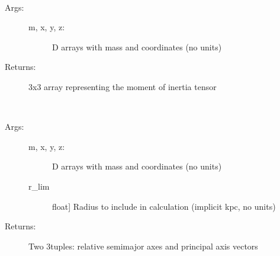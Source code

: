 \documentclass[letterpaper,10pt,english]{sphinxmanual}
\begin{document}
\begin{fulllineitems}
\begin{fulllineitems}
\end{fulllineitems}


\begin{fulllineitems}
\label{\detokenize{remnant:galaxy.remnant.Remnant.I_tensor}}~\begin{description}
\item[{Args:}] \leavevmode\begin{description}
\item[{m, x, y, z:}] \sphinxhyphen{}D arrays with mass and coordinates (no units)

\end{description}

\item[{Returns:}] \leavevmode
3x3 array representing the moment of inertia tensor

\end{description}

\end{fulllineitems}


\begin{fulllineitems}
\label{\detokenize{remnant:galaxy.remnant.Remnant.ellipsoid_axes}}~\begin{description}
\item[{Args:}] \leavevmode\begin{description}
\item[{m, x, y, z:}] \sphinxhyphen{}D arrays with mass and coordinates (no units)

\item[{r\_lim}] \leavevmode{[}float{]}
Radius to include in calculation (implicit kpc, no units)

\end{description}

\item[{Returns:}] \leavevmode
Two 3\sphinxhyphen{}tuples: relative semimajor axes and principal axis vectors

\end{description}


\end{fulllineitems}
\end{fulllineitems}
\end{document}
